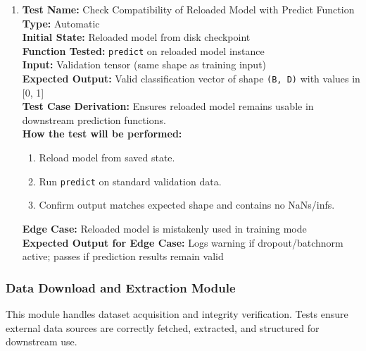 \documentclass[12pt, titlepage]{article}
\begin{document}
\begin{enumerate}
  \item \textbf{Test Name:} Check Compatibility of Reloaded Model with Predict Function\\
  \textbf{Type:} Automatic\\
  \textbf{Initial State:} Reloaded model from disk checkpoint\\
  \textbf{Function Tested:} \verb|predict| on reloaded model instance\\
  \textbf{Input:} Validation tensor (same shape as training input)\\
  \textbf{Expected Output:} Valid classification vector of shape \verb|(B, D)| with values in [0, 1]\\
  \textbf{Test Case Derivation:} Ensures reloaded model remains usable in downstream prediction functions.\\
  \textbf{How the test will be performed:}
  \begin{enumerate}
    \item Reload model from saved state.
    \item Run \verb|predict| on standard validation data.
    \item Confirm output matches expected shape and contains no NaNs/infs.
  \end{enumerate}
  \textbf{Edge Case:} Reloaded model is mistakenly used in training mode\\
  \textbf{Expected Output for Edge Case:} Logs warning if dropout/batchnorm active; passes if prediction results remain valid\\
\end{enumerate}

\subsubsection{Data Download and Extraction Module}
This module handles dataset acquisition and integrity verification. Tests ensure external data sources are correctly fetched, extracted, and structured for downstream use.
\end{document}
